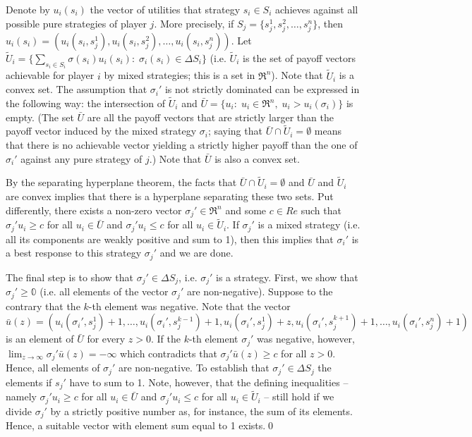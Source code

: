 \documentclass[a4paper,11pt]{article}
\begin{document}
Denote by $u_i(s_i)$ the vector of utilities that strategy $s_i\in S_i$ achieves against all possible pure strategies of player $j$. More precisely, if $S_j=\{s_j^1,s_j^2,\dots,s_j^n\}$, then $u_i(s_i)=(u_i(s_i,s_j^1),u_i(s_i,s_j^2),\dots,u_i(s_i,s_j^n))$. Let $\tilde{U}_i=\{\sum_{s_i\in S_i}\sigma(s_i) u_i(s_i):\;\sigma_i(s_i)\in\Delta S_i\}$ (i.e. $\tilde{U}_i$ is the set of payoff vectors achievable for player $i$ by mixed strategies; this is a set in $\Re^n$). Note that $\tilde{U}_i$ is a convex set. The assumption that $\sigma_i'$ is not strictly dominated can be expressed in the following way: the intersection of $\tilde{U}_i$ and $\bar{U}=\{ u_i:\;u_i\in\Re^n,\;u_i>u_i(\sigma_i)\}$ is empty. (The set $\bar{{U}}$ are all the payoff vectors that are strictly larger than the payoff vector induced by the mixed strategy $\sigma_i$; saying that $\bar{U}\cap\tilde{U}_i=\emptyset$ means that there is no achievable vector yielding a strictly higher payoff than the one of $\sigma_i'$  against any pure strategy of $j$.) Note that $\bar{U}$ is also a convex set.

By the separating hyperplane theorem, the facts that $\bar{U}\cap\tilde{U}_i=\emptyset$ and $\bar{U}$ and $\tilde{U}_i$ are convex implies that there is a hyperplane separating these two sets. Put differently, there exists a non-zero vector $\sigma_j'\in \Re^n$ and some $c\in Re$ such that $\sigma_j' u_i\geq c$ for all $u_i\in \bar{U}$ and $\sigma_j'u_i\leq c$ for all $u_i\in\tilde{U}_i$. If $\sigma_j'$ is a mixed strategy (i.e. all its components are weakly positive and sum to 1), then this implies that $\sigma_i'$ is a best response to this strategy $\sigma_j'$ and we are done.

The final step is to show that $\sigma_j'\in\Delta S_j$, i.e. $\sigma_j'$ is a strategy. First, we show that $\sigma_j'\geq \mathbb{0}$ (i.e. all elements of the vector $\sigma_j'$ are non-negative). Suppose to the contrary that the $k$-th element was negative. Note that the vector $\bar u(z)=(u_i(\sigma_i',s_j^1)+1,\dots,u_i(\sigma_i',s_j^{k-1})+1,u_i(\sigma_i',s_j^1)+z,u_i(\sigma_i',s_j^{k+1})+1,\dots,u_i(\sigma_i',s_j^n)+1)$ is an element of $\bar{U}$ for every $z>0$. If the $k$-th element $\sigma_j'$ was negative, however, $\lim_{z\rightarrow\infty}\sigma_j' \bar u(z)=-\infty$ which contradicts that $\sigma_j'\bar u(z)\geq c$ for all $z>0$. Hence, all elements of $\sigma_j'$ are non-negative. To establish that $\sigma_j'\in \Delta S_j$ the elements if $s_j'$ have to sum to 1. Note, however, that the defining inequalities -- namely $\sigma_j' u_i\geq c$ for all $u_i\in \bar{U}$ and $\sigma_j'u_i\leq c$ for all $u_i\in\tilde{U}_i$ -- still hold if we divide $\sigma_j'$ by a strictly positive number as, for instance, the sum of its elements. Hence, a suitable vector with element sum equal to 1 exists.\qed
\end{document}
